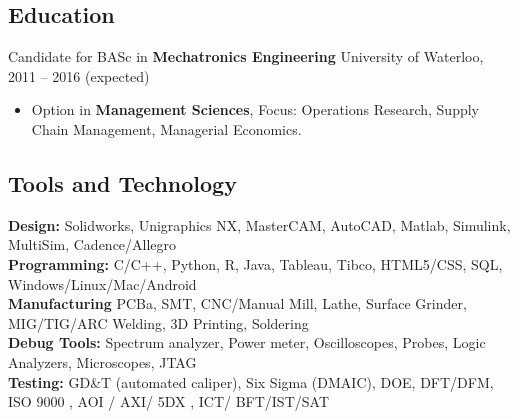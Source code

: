 \documentclass[pdftex,11pt,letterpaper]{article}
\begin{document}
\subsection*{Education}
Candidate for BASc in \textbf{Mechatronics Engineering} \hfill {\color{gray} University of Waterloo, 2011 -- 2016 (expected)}
\begin{itemize}
  \item Option in \textbf{Management Sciences}, Focus: Operations Research, Supply Chain Management, Managerial Economics.
\end{itemize}

\subsection*{Tools and Technology}
\textbf{Design:} Solidworks, Unigraphics NX, MasterCAM, AutoCAD, Matlab, Simulink, MultiSim, Cadence/Allegro \\
\textbf{Programming:} C/C++, Python, R, Java, Tableau, Tibco, HTML5/CSS, SQL, Windows/Linux/Mac/Android\\
\textbf{Manufacturing} PCBa, SMT, CNC/Manual Mill, Lathe, Surface Grinder, MIG/TIG/ARC Welding, 3D Printing, Soldering \\
\textbf{Debug Tools:} Spectrum analyzer, Power meter, Oscilloscopes, Probes, Logic Analyzers, Microscopes, JTAG\\
\textbf{Testing:} GD\&T (automated caliper), Six Sigma (DMAIC), DOE, DFT/DFM, ISO 9000 , AOI / AXI/ 5DX , ICT/ BFT/IST/SAT
\end{document}
